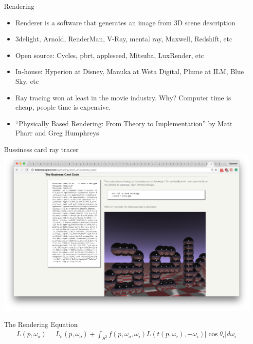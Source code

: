 \documentclass[pdf]
{beamer}
\begin{document}
\begin{frame}{Rendering}
  \begin{itemize}
    \pause
  \item Renderer is a software that generates an image from 3D scene description
    \pause
  \item 3delight, Arnold, RenderMan, V-Ray, mental ray, Maxwell, Redshift, etc
    \pause
  \item Open source: Cycles, pbrt, appleseed, Mitsuba, LuxRender, etc
    \pause
  \item In-house: Hyperion at Disney, Manuka at Weta Digital, Plume at ILM, Blue Sky, etc
    \pause
  \item Ray tracing won at least in the movie industry. \pause Why?
    \pause
    Computer time is cheap, people time is expensive.
    \pause
  \item ``Physically Based Rendering: From Theory to Implementation'' by Matt Pharr and Greg Humphreys
  \end{itemize}
\end{frame}

\begin{frame}{Bussiness card ray tracer}
\includegraphics[scale=0.115]{images/card}
\end{frame}

\begin{frame}{The Rendering Equation}
  \begin{align*}
    L(p, \omega_o) = L_e(p, \omega_o) + \int_{S^2} f(p, \omega_o, \omega_i) L(t(p, \omega_i), -\omega_i) \left| \cos \theta_i \right| d \omega_i
  \end{align*}
\end{frame}
\end{document}

